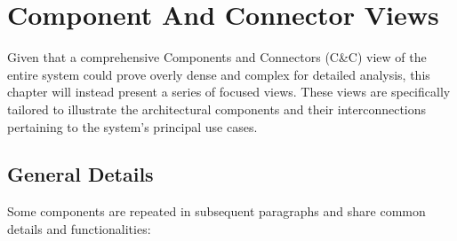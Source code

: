 \chapter{Component And Connector Views}

\begin{justify}
    Given that a comprehensive Components and Connectors (C\&C) view of the entire system could prove overly dense and complex for detailed analysis, this chapter will instead present a series of focused views. These views are specifically tailored to illustrate the architectural components and their interconnections pertaining to the system's principal use cases.
\end{justify}

\section{General Details}
Some components are repeated in subsequent paragraphs and share common details and functionalities:

